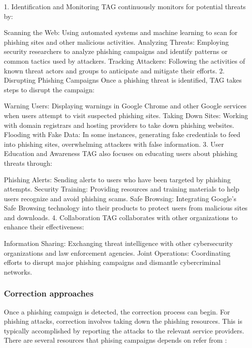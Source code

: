 \documentclass{ijitcs}
\begin{document}
1. Identification and Monitoring
TAG continuously monitors for potential threats by:

Scanning the Web: Using automated systems and machine learning to scan for phishing sites and other malicious activities.
Analyzing Threats: Employing security researchers to analyze phishing campaigns and identify patterns or common tactics used by attackers.
Tracking Attackers: Following the activities of known threat actors and groups to anticipate and mitigate their efforts.
2. Disrupting Phishing Campaigns
Once a phishing threat is identified, TAG takes steps to disrupt the campaign:

Warning Users: Displaying warnings in Google Chrome and other Google services when users attempt to visit suspected phishing sites.
Taking Down Sites: Working with domain registrars and hosting providers to take down phishing websites.
Flooding with Fake Data: In some instances, generating fake credentials to feed into phishing sites, overwhelming attackers with false information.
3. User Education and Awareness
TAG also focuses on educating users about phishing threats through:

Phishing Alerts: Sending alerts to users who have been targeted by phishing attempts.
Security Training: Providing resources and training materials to help users recognize and avoid phishing scams.
Safe Browsing: Integrating Google's Safe Browsing technology into their products to protect users from malicious sites and downloads.
4. Collaboration
TAG collaborates with other organizations to enhance their effectiveness:

Information Sharing: Exchanging threat intelligence with other cybersecurity organizations and law enforcement agencies.
Joint Operations: Coordinating efforts to disrupt major phishing campaigns and dismantle cybercriminal networks.










\subsubsection{Correction approaches}

Once a phishing campaign is detected, the correction process can begin. For phishing attacks, correction involves taking down the phishing resources. This is typically accomplished by reporting the attacks to the relevant service providers.
There are several resources that phising campaigns depends on refer from \cite{khonji2013phishing} :
\end{document}

